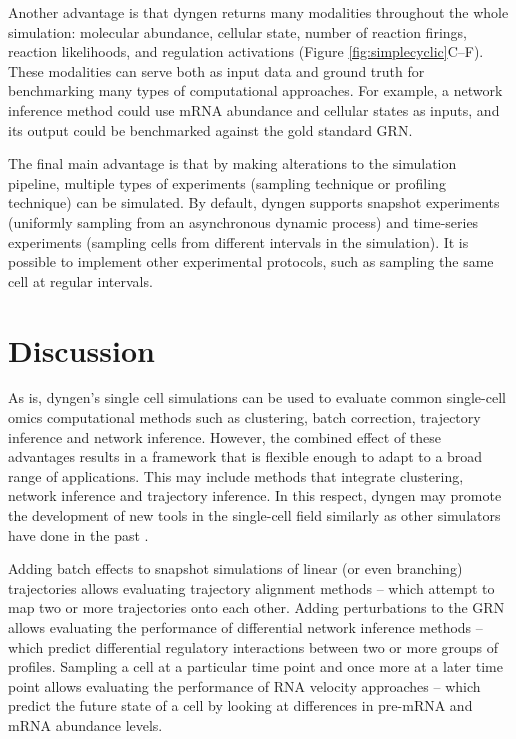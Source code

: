 Another advantage is that dyngen returns many modalities throughout the whole simulation: molecular abundance, cellular state, number of reaction firings, reaction likelihoods, and regulation activations (Figure \ref{fig:simplecyclic}C--F). These modalities can serve both as input data and ground truth for benchmarking many types of computational approaches. For example, a network inference method could use mRNA abundance and cellular states as inputs, and its output could be benchmarked against the gold standard GRN.

The final main advantage is that by making alterations to the simulation pipeline, multiple types of experiments (sampling technique or profiling technique) can be simulated. By default, dyngen supports snapshot experiments (uniformly sampling from an asynchronous dynamic process) and time-series experiments (sampling cells from different intervals in the simulation). 
It is possible to implement other experimental protocols, such as sampling the same cell at regular intervals. 



\section{Discussion}
As is, dyngen's single cell simulations can be used to evaluate common single-cell omics computational methods such as clustering, batch correction, trajectory inference and network inference.
However, the combined effect of these advantages results in a framework that is flexible enough to adapt to a broad range of applications. This may include methods that integrate clustering, network inference and trajectory inference. In this respect, dyngen may promote the development of new tools in the single-cell field similarly as other simulators have done in the past \cite{schaffter_genenetweaversilicobenchmark_2011,ewing_combiningtumorgenome_2015}.

Adding batch effects to snapshot simulations of linear (or even branching) trajectories allows evaluating trajectory alignment methods -- which attempt to map two or more trajectories onto each other. Adding perturbations to the GRN allows evaluating the performance of differential network inference methods -- which predict differential regulatory interactions between two or more groups of profiles.  Sampling a cell at a particular time point and once more at a later time point allows evaluating the performance of RNA velocity approaches -- which predict the future state of a cell by looking at differences in pre-mRNA and mRNA abundance levels.

